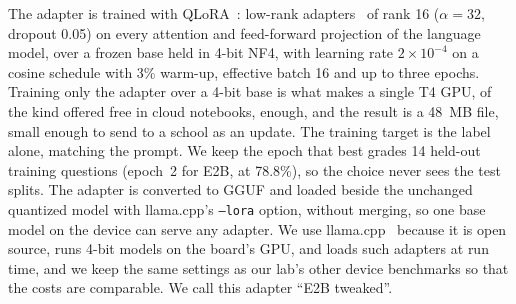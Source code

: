 \documentclass[journal]{IEEEtran}
\begin{document}
The adapter is trained with QLoRA~\cite{dettmers2023qlora}: low-rank adapters~\cite{hu2022lora} of rank 16 ($\alpha=32$, dropout 0.05) on every attention and feed-forward projection of the language model, over a frozen base held in 4-bit NF4, with learning rate $2\times10^{-4}$ on a cosine schedule with 3\% warm-up, effective batch 16 and up to three epochs.
Training only the adapter over a 4-bit base is what makes a single T4 GPU, of the kind offered free in cloud notebooks, enough, and the result is a 48~MB file, small enough to send to a school as an update.
The training target is the label alone, matching the prompt.
We keep the epoch that best grades 14 held-out training questions (epoch~2 for E2B, at 78.8\%), so the choice never sees the test splits.
The adapter is converted to GGUF and loaded beside the unchanged quantized model with llama.cpp's \texttt{--lora} option, without merging, so one base model on the device can serve any adapter. We use llama.cpp~\cite{llamacpp} because it is open source, runs 4-bit models on the board's GPU, and loads such adapters at run time, and we keep the same settings as our lab's other device benchmarks so that the costs are comparable.
We call this adapter ``E2B tweaked''.
\end{document}
